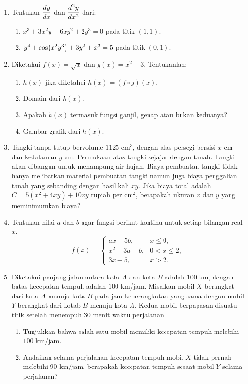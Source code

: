 \begin{enumerate}[leftmargin=*, label={\arabic*}.]
\item Tentukan $\displaystyle\frac{dy}{dx}$ dan $\displaystyle\frac{d^{2}y}{dx^{2}}$ dari:
\begin{enumerate}[label={\alph*}.]
    \item $x^{3}+3x^{2}y-6xy^{2}+2y^{3}=0$ pada titik $(1,1)$.
    \item $y^{4}+\cos\bracket*{x^{2}y^{3}}+3y^{2}+x^{2}=5$ pada titik $(0,1)$.
\end{enumerate}
\item Diketahui $f(x)=\sqrt{x}$ dan $g(x)=x^{2}-3$. Tentukanlah:
\begin{enumerate}[label={\alph*}.]
    \item $h(x)$ jika diketahui $h(x)=(f \circ g)(x)$.
    \item Domain dari $h(x)$.
    \item Apakah $h(x)$ termasuk fungsi ganjil, genap atau bukan keduanya?
    \item Gambar grafik dari $h(x)$.
\end{enumerate}
\item Tangki tanpa tutup bervolume $1125$ cm$^3$, dengan alas persegi bersisi $x$ 
cm dan kedalaman $y$ cm. Permukaan atas tangki sejajar dengan tanah. Tangki akan 
dibangun untuk menampung air hujan. Biaya pembuatan tangki tidak hanya melibatkan 
material pembuatan tangki namun juga biaya penggalian tanah yang sebanding dengan 
hasil kali $xy$. Jika biaya total adalah $C=5(x^{2}+4xy)+10xy$ rupiah per cm$^2$, 
berapakah ukuran $x$ dan $y$ yang meminimumkan biaya?
\item Tentukan nilai $a$ dan $b$ agar fungsi berikut kontinu untuk setiap bilangan 
real $x$.
\[
    f(x)=
    \begin{cases}
        ax+5b, &x \leq 0,\\
        x^2+3a-b, &0 < x \leq 2,\\
        3x-5, &x > 2.
    \end{cases}
\]
\item Diketahui panjang jalan antara kota $A$ dan kota $B$ adalah $100$ km, dengan 
batas kecepatan tempuh adalah $100$ km/jam. Misalkan mobil $X$ berangkat dari kota 
$A$ menuju kota $B$ pada jam keberangkatan yang sama dengan mobil $Y$ berangkat 
dari kotab $B$ menuju kota $A$. Kedua mobil berpapasan disuatu titik setelah 
menempuh 30 menit waktu perjalanan.
\begin{enumerate}[label={\alph*}.]
    \item Tunjukkan bahwa salah satu mobil memiliki kecepatan tempuh melebihi $100$ 
    km/jam.
    \item  Andaikan selama perjalanan kecepatan tempuh mobil $X$ tidak pernah melebihi
    $90$ km/jam, berapakah kecepatan tempuh sesaat mobil $Y$ selama perjalanan?
\end{enumerate}
\end{enumerate}
